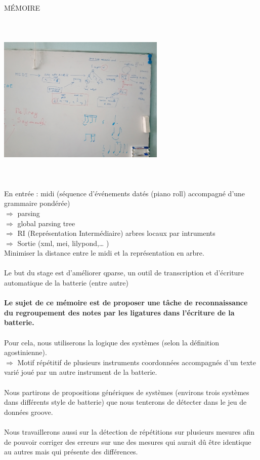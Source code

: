 	MÉMOIRE\\\\
	\includegraphics[height=80mm, width=80mm]{images/sujet_stage.jpg} \\\\
	En entrée : midi (séquence d’événements datés (piano roll) accompagné d’une grammaire pondérée)\\
	$\Rightarrow$ parsing\\
	$\Rightarrow$ global parsing tree\\
	$\Rightarrow$ RI (Représentation Intermédiaire) arbres locaux par intruments\\
	$\Rightarrow$ Sortie (xml, mei, lilypond,… )\\
	Minimiser la distance entre le midi et la représentation en arbre.\\\\
	Le but du stage est d’améliorer qparse, un outil de transcription et d’écriture automatique de la batterie (entre autre)\\\\
	\textbf{Le sujet de ce mémoire est de proposer une tâche de reconnaissance du regroupement des notes par les ligatures dans l’écriture de la batterie.}\\\\
	Pour cela, nous utiliserons la logique des systèmes (selon la définition agostinienne).\\$\Rightarrow$ Motif répétitif de plusieurs instruments coordonnées accompagnés d’un texte varié joué par un autre instrument de la batterie.\\\\Nous partirons de propositions génériques de systèmes (environs trois systèmes dans différents style de batterie) que nous tenterons de détecter dans le jeu de données groove.\\\\
	Nous travaillerons aussi sur la détection de répétitions sur plusieurs mesures afin de pouvoir corriger des erreurs sur une des mesures qui aurait dû être identique au autres mais qui présente des différences.
	
	
	
